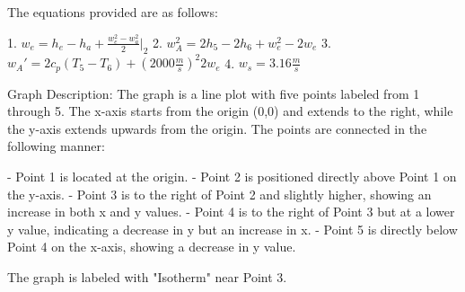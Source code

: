The equations provided are as follows:

1. \( w_e = h_e - h_a + \frac{w_e^2 - w_a^2}{2} \bigg|_2 \)
2. \( w_A^2 = 2h_5 - 2h_6 + w_e^2 - 2w_e \)
3. \( w_A' = 2c_p ( T_5 - T_6 ) + \left( 2000 \frac{m}{s} \right)^2 2w_e \)
4. \( w_s = 3.16 \frac{m}{s} \)

Graph Description:
The graph is a line plot with five points labeled from 1 through 5. The x-axis starts from the origin (0,0) and extends to the right, while the y-axis extends upwards from the origin. The points are connected in the following manner:

- Point 1 is located at the origin.
- Point 2 is positioned directly above Point 1 on the y-axis.
- Point 3 is to the right of Point 2 and slightly higher, showing an increase in both x and y values.
- Point 4 is to the right of Point 3 but at a lower y value, indicating a decrease in y but an increase in x.
- Point 5 is directly below Point 4 on the x-axis, showing a decrease in y value.

The graph is labeled with "Isotherm" near Point 3.